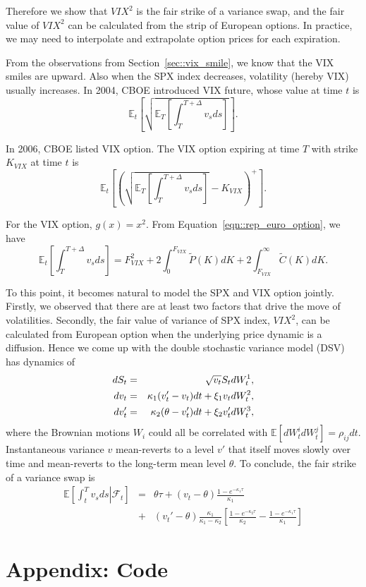 \documentclass[11pt,reqno,final]{amsart}
\begin{document}
Therefore we show that $VIX^2$ is the fair strike of a variance swap, and the fair value of $VIX^2$ can be calculated from the strip of European options. In practice, we may need to interpolate and extrapolate option prices for each expiration. 

From the observations from Section~\ref{sec::vix_smile}, we know that the VIX smiles are upward. Also when the SPX index decreases, volatility (hereby VIX) usually increases. In 2004, CBOE introduced VIX future, whose value at time $t$ is
$$
\mathbb{E}_t\left[\sqrt{\mathbb{E}_T\left[\int_{T}^{T+\Delta} v_s ds\right]}\right].
$$

In 2006, CBOE listed VIX option. The VIX option expiring at time $T$ with strike $K_{VIX}$ at time $t$ is 
$$
\mathbb{E}_t\left[\left(\sqrt{\mathbb{E}_T\left[\int_{T}^{T+\Delta} v_s ds\right]} - K_{VIX}\right)^{+}\right].
$$

For the VIX option, $g(x)=x^2$. From Equation~\ref{eqn::rep_euro_option}, we have
$$
\mathbb{E}_t\left[\int_T^{T+\Delta} v_s ds\right] = F_{VIX}^2 + 2\int_{0}^{F_{VIX}} \tilde{P}(K)dK + 2\int_{F_{VIX}}^{\infty}\tilde{C}(K) dK.
$$

To this point, it becomes natural to model the SPX and VIX option jointly. Firstly, we observed that there are at least two factors that drive the move of volatilities. Secondly, the fair value of variance of SPX index, $VIX^2$, can be calculated from European option when the underlying price dynamic is a diffusion. Hence we come up with the double stochastic variance model (DSV) has dynamics of
\begin{eqnarray}
dS_t &=& \sqrt{v_t} S_t d W_t^1, \notag \\
dv_t &=& \kappa_1 (v_t' - v_t) dt + \xi_1 v_t dW_t^2, \\
dv_t' &=& \kappa_2 (\theta - v_t') dt + \xi_2 v_t' dW_t^3, \notag \\
\end{eqnarray}
where the Brownian motions $W_i$ could all be correlated with $\mathbb{E}[dW_t^i dW_t^j]=\rho_{ij} dt$. Instantaneous variance $v$ mean-reverts to a level $v'$ that itself moves slowly over time and mean-reverts to the long-term mean level $\theta$. To conclude, the fair strike of a variance swap is 
\begin{eqnarray*}
\mathbb{E}\left[ \left.\int_t^T v_s ds \right| \mathcal{F}_t\right] &=& \theta \tau + (v_t-\theta) \frac{1-e^{-\kappa_1\tau}}{\kappa_1} \\
    &+& (v_t'-\theta)\frac{\kappa_1}{\kappa_1-\kappa_2}\left[\frac{1-e^{-\kappa_2\tau}}{\kappa_2}- \frac{1-e^{-\kappa_1\tau}}{\kappa_1}\right]
\end{eqnarray*}
%
%


%
%
\newpage
\section*{Appendix: Code}

\end{document}
